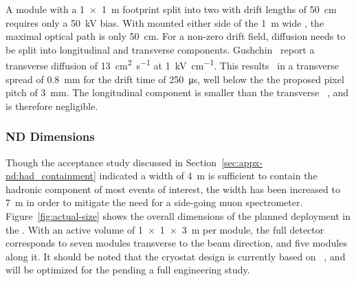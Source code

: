 A module with a \SI{1x1}{\metre} footprint split into two  with drift lengths of \SI{50}{\centi\metre} requires only a \SI{50}{\kilo\volt} bias.
With  mounted either side of the \SI{1}{\metre} wide , the maximal optical path is only \SI{50}{\centi\metre}.
For a non-zero drift field, diffusion needs to be split into longitudinal and transverse components. Gushchin~\cite{gushchin} report a transverse diffusion of \SI{13}{\centi\metre\squared\per\second} at \SI{1}{\kilo\volt\per\centi\metre}.
This results~\cite{Chepel:2012sj} in a transverse spread of \SI{0.8}{\milli\metre} for the drift time of \SI{250}{\micro\second}, well below the the proposed pixel pitch of \SI{3}{\milli\metre}.
The longitudinal component is smaller than the transverse ~\cite{Chepel:2012sj},  and is therefore negligible.

\subsubsection{ND Dimensions}
\label{sec:appx-nd:det_dimensions}

Though the acceptance study discussed in Section~\ref{sec:appx-nd:had_containment} indicated a width of \SI{4}{\metre} is sufficient to contain the hadronic component of most events of interest, the width has been increased to 
\SI{7}{\metre} in order to mitigate the need for a side-going muon spectrometer.
Figure~\ref{fig:actual-size} shows the overall dimensions of the planned  deployment in the   . 
With an active volume of \SI{1x1x3}{\metre} per module, the full  detector corresponds to seven modules transverse to the beam direction, and five modules along it. 
It should be noted that the cryostat design is currently based on ~\cite{Abi:2017aow}, and will be optimized for the   pending a full engineering study.  

